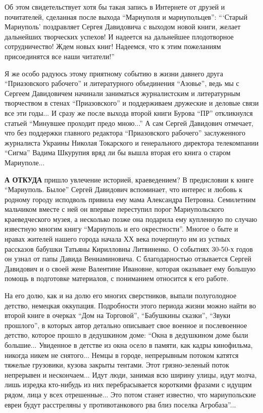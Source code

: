 Об этом свидетельствует хотя бы такая запись в Интернете от друзей и
почитателей, сделанная после выхода \enquote{Мариуполя и мариупольцев}:
\enquote{\enquote{Старый Мариуполь} поздравляет Сергея Давидовича с выходом
новой книги,  желает дальнейших творческих успехов! И надеется на дальнейшее
плодотворное сотрудничество! Ждем новых книг! Надеемся, что к этим пожеланиям
присоединятся все наши читатели!}

Я же особо радуюсь этому приятному событию в жизни давнего друга
\enquote{Приазовского рабочего} и литературного объединения \enquote{Азовье},
ведь мы с Сергеем Давидовичем начинали заниматься журналистским и литературным
творчеством в стенах \enquote{Приазовского} и поддерживаем дружеские и деловые
связи все эти годы... И сразу же после выхода второй книги Бурова \enquote{ПР}
откликнулся статьей \enquote{Минувшее проходит предо мною...} А сам Сергей
Давидович отмечает, что без поддержки главного редактора \enquote{Приазовского
рабочего} заслуженного журналиста Украины Николая Токарского и генерального
директора телекомпании \enquote{Сигма} Вадима Шкурупия вряд ли бы вышла вторая
его книга о старом Мариуполе...

\textbf{А ОТКУДА} пришло увлечение историей, краеведением? В предисловии к книге
\enquote{Мариуполь. Былое} Сергей Давидович вспоминает, что интерес и любовь к
родному городу исподволь привила ему мама Александра Петровна. Семилетним
мальчиком вместе с ней он впервые переступил порог Мариупольского
краеведческого музея, а несколько позже она подарила ему купленную по случаю
известную многим книгу \enquote{Мариуполь и его окрестности}. Многое о быте и
нравах жителей нашего города начала ХХ века почерпнуто им из устных рассказов
бабушки Татьяны Кирилловны Литвиненко. О событиях 30-50-х годов он узнал от
папы Давида Вениаминовича. С благодарностью отзывается Сергей Давидович и о
своей жене Валентине Ивановне, которая оказывает ему большую помощь в
подготовке материалов, с пониманием относится к его работе.

На его долю, как и на долю его многих сверстников, выпали полуголодное детство,
немецкая оккупация. Подробности этого периода жизни можно найти во второй книге
в очерках \enquote{Дом на Торговой}, \enquote{Бабушкины сказки}, \enquote{Звуки
прошлого}, в которых автор детально описывает свое военное и послевоенное
детство, которое прошло в дедушкином доме: \enquote{Окна в дедушкином доме были
большие... Увиденное в детстве из окна осело в памяти, как кадры кинофильма,
никогда никем не снятого... Немцы в городе, непрерывным потоком катятся тяжелые
грузовики, кузова закрыты тентами.  Этот грязно-зеленый поток непрерывен и
нескончаем... Идут люди, занимая всю ширину улицы, идут молча, лишь изредка
кто-нибудь из них перебрасывается короткими фразами с идущим рядом, лица у всех
отрешенные... Это потом станет известно, что мариупольские евреи будут
расстреляны у противотанкового рва близ поселка Агробаза}...

